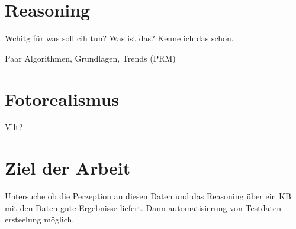  

\section{Reasoning}

Wchitg für was soll cih tun? Was ist das? Kenne ich das schon.

Paar Algorithmen, Grundlagen, Trends (PRM) 

\section{Fotorealismus}

Vllt?

\section{Ziel der Arbeit}
\label{sec:goal}

Untersuche ob die Perzeption an diesen Daten und das Reasoning über ein KB mit den Daten gute Ergebnisse liefert. Dann automatisierung von Testdaten ersteelung möglich. 